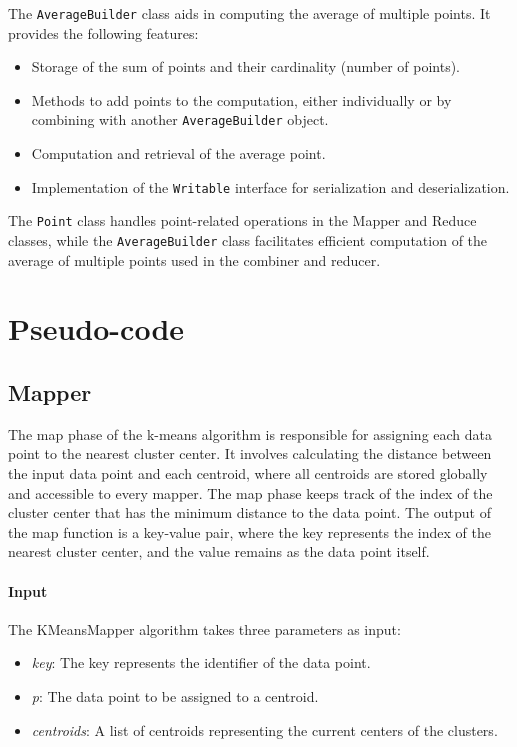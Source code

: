\documentclass[parskip=full]{report}
\begin{document}
	The \texttt{AverageBuilder} class aids in computing the average of multiple points. It provides the following features:

	\begin{itemize}
		\item Storage of the sum of points and their cardinality (number of points).
		\item Methods to add points to the computation, either individually or by combining with another \texttt{AverageBuilder} object.
		\item Computation and retrieval of the average point.
		\item Implementation of the \texttt{Writable} interface for serialization and deserialization.
	\end{itemize}

	The \texttt{Point} class handles point-related operations in the Mapper and Reduce classes, while the \texttt{AverageBuilder} class facilitates efficient computation of the average of multiple points used in the combiner and reducer.



\section{Pseudo-code}

\subsection{Mapper}
The map phase of the k-means algorithm is responsible for assigning each data point to the nearest cluster center. It involves calculating the distance between the input data point and each centroid, where all centroids are stored globally and accessible to every mapper. The map phase keeps track of the index of the cluster center that has the minimum distance to the data point. The output of the map function is a key-value pair, where the key represents the index of the nearest cluster center, and the value remains as the data point itself.

\paragraph{Input}
The KMeansMapper algorithm takes three parameters as input:
\begin{itemize}
	\item \textit{key}: The key represents the identifier of the data point.
	\item \textit{p}: The data point to be assigned to a centroid.
	\item \textit{centroids}: A list of centroids representing the current centers of the clusters.
\end{itemize}
\end{document}
